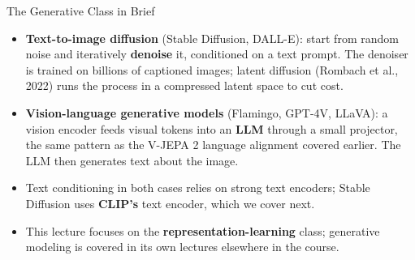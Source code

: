 \begin{frame}{The Generative Class in Brief}
  \begin{itemize}\itemsep0.3em
    \item \textbf{Text-to-image diffusion} (Stable Diffusion, DALL-E): start from random noise and iteratively \textbf{denoise} it, conditioned on a text prompt. The denoiser is trained on billions of captioned images; latent diffusion (Rombach et al., 2022) runs the process in a compressed latent space to cut cost.
    \item \textbf{Vision-language generative models} (Flamingo, GPT-4V, LLaVA): a vision encoder feeds visual tokens into an \textbf{LLM} through a small projector, the same pattern as the V-JEPA 2 language alignment covered earlier. The LLM then generates text about the image.
    \item Text conditioning in both cases relies on strong text encoders; Stable Diffusion uses \textbf{CLIP's} text encoder, which we cover next.
    \item This lecture focuses on the \textbf{representation-learning} class; generative modeling is covered in its own lectures elsewhere in the course.
  \end{itemize}
\end{frame}
